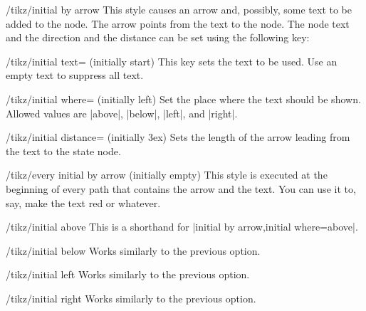 \begin{stylekey}{/tikz/initial by arrow}
    This style causes an arrow and, possibly, some text to be added to the
    node. The arrow points from the text to the node. The node text and the
    direction and the distance can be set using the following key:
    \begin{key}{/tikz/initial text= (initially start)}
        This key sets the text to be used. Use an empty text to suppress all
        text.
    \end{key}
    \begin{key}{/tikz/initial where= (initially left)}
        Set the place where the text should be shown. Allowed values are
        |above|, |below|, |left|, and |right|.
    \end{key}
    \begin{key}{/tikz/initial distance= (initially 3ex)}
        Sets the length of the arrow leading from the text to the state node.
    \end{key}
    \begin{stylekey}{/tikz/every initial by arrow (initially \normalfont empty)}
        This style is executed at the beginning of every path that contains the
        arrow and the text. You can use it to, say, make the text red or
        whatever.
    \end{stylekey}
\begin{codeexample}[]
\end{codeexample}
\end{stylekey}

\begin{stylekey}{/tikz/initial above}
    This is a shorthand for |initial by arrow,initial where=above|.
\end{stylekey}

\begin{stylekey}{/tikz/initial below}
    Works similarly to the previous option.
\end{stylekey}

\begin{stylekey}{/tikz/initial left}
    Works similarly to the previous option.
\end{stylekey}

\begin{stylekey}{/tikz/initial right}
    Works similarly to the previous option.
\end{stylekey}

